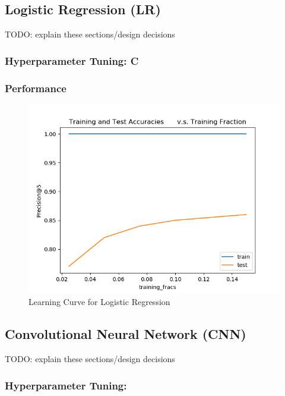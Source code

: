 \documentclass{sig-alternate-05-2015}
\begin{document}
\subsection{Logistic Regression (LR)}

TODO: explain these sections/design decisions

\subsubsection{Hyperparameter Tuning: C}


\subsubsection{Performance}
\begin{figure}[H]
\centering
\includegraphics[width=\linewidth]{plots/learning_curve_lr.png}
\caption{Learning Curve for Logistic Regression}
\end{figure}

\subsection{Convolutional Neural Network (CNN)}
TODO: explain these sections/design decisions

\subsubsection{Hyperparameter Tuning: }
\end{document}
